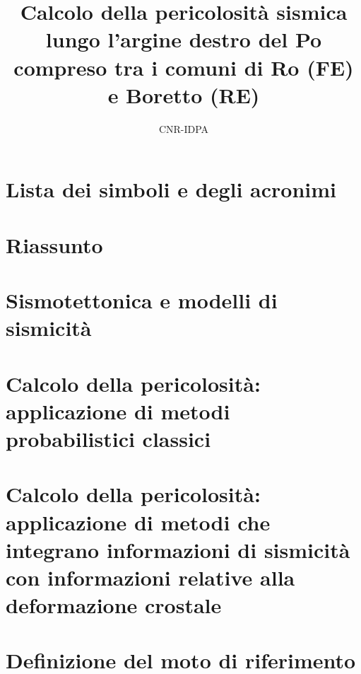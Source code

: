 \documentclass[12pt,a4paper,smallheadings]{scrreprt}
\author{CNR-IDPA}
\title{Calcolo della pericolosit\`a sismica lungo l'argine destro 
del Po compreso tra i comuni di Ro (FE) e Boretto (RE)}
\begin{document}
\maketitle
\tableofcontents

\chapter*{Lista dei simboli e degli acronimi}


\chapter*{Riassunto}


\chapter{Sismotettonica e modelli di sismicit\`a}


\chapter{Calcolo della pericolosit\`a: applicazione di metodi 
   probabilistici classici}


\chapter{Calcolo della pericolosit\`a: applicazione di metodi 
   che integrano informazioni di sismicit\`a con informazioni
   relative alla deformazione crostale}


\chapter{Definizione del moto di riferimento}




\end{document}
